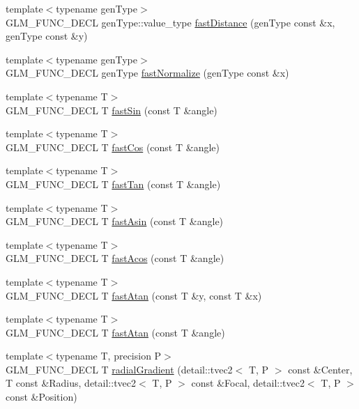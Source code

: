 \begin{CompactItemize}
\item 
{\footnotesize template$<$typename genType$>$ }\\GLM\_\-FUNC\_\-DECL genType::value\_\-type \hyperlink{group__gtx__fast__square__root_g38aff4a231786efed3482b015da34b66}{fastDistance} (genType const \&x, genType const \&y)
\item 
{\footnotesize template$<$typename genType$>$ }\\GLM\_\-FUNC\_\-DECL genType \hyperlink{group__gtx__fast__square__root_g06fee9a90e853107e9d70d690dccf478}{fastNormalize} (genType const \&x)
\item 
{\footnotesize template$<$typename T$>$ }\\GLM\_\-FUNC\_\-DECL T \hyperlink{group__gtx__fast__trigonometry_g2f7a014f1fb9b16ede8b0cac0beba9f1}{fastSin} (const T \&angle)
\item 
{\footnotesize template$<$typename T$>$ }\\GLM\_\-FUNC\_\-DECL T \hyperlink{group__gtx__fast__trigonometry_g40743124db6dc2a59de72aa81bc1cf93}{fastCos} (const T \&angle)
\item 
{\footnotesize template$<$typename T$>$ }\\GLM\_\-FUNC\_\-DECL T \hyperlink{group__gtx__fast__trigonometry_gd182bf6a962a33e47d5f6daf06ca3d6b}{fastTan} (const T \&angle)
\item 
{\footnotesize template$<$typename T$>$ }\\GLM\_\-FUNC\_\-DECL T \hyperlink{group__gtx__fast__trigonometry_g8c49efe243e7ad6ed58a3bcf07b560a0}{fastAsin} (const T \&angle)
\item 
{\footnotesize template$<$typename T$>$ }\\GLM\_\-FUNC\_\-DECL T \hyperlink{group__gtx__fast__trigonometry_g7f5301bad6bd3a073be8882ac1f4f5d4}{fastAcos} (const T \&angle)
\item 
{\footnotesize template$<$typename T$>$ }\\GLM\_\-FUNC\_\-DECL T \hyperlink{group__gtx__fast__trigonometry_gc6605aad8dce8278938f58b6e68b036a}{fastAtan} (const T \&y, const T \&x)
\item 
{\footnotesize template$<$typename T$>$ }\\GLM\_\-FUNC\_\-DECL T \hyperlink{group__gtx__fast__trigonometry_g0f10c61865500e4cfe86ad070e5d6312}{fastAtan} (const T \&angle)
\item 
{\footnotesize template$<$typename T, precision P$>$ }\\GLM\_\-FUNC\_\-DECL T \hyperlink{group__gtx__gradient__paint_g5e9373dad017d6547ce8db966d02394e}{radialGradient} (detail::tvec2$<$ T, P $>$ const \&Center, T const \&Radius, detail::tvec2$<$ T, P $>$ const \&Focal, detail::tvec2$<$ T, P $>$ const \&Position)

\end{CompactItemize}
